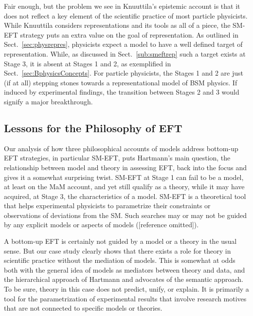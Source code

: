 Fair enough, but the problem we see in Knuuttila's epistemic account is that it does not reflect a key element of the scientific practice of most particle physicists. 
While Knuuttila considers representations and its tools as all of a piece, the SM-EFT strategy puts an extra value on the goal of representation. 
As outlined in Sect.~\ref{sec:physrepres}, physicists expect a model to have a well defined target of representation. 
While, as discussed in Sect.~\ref{sub:smeftrep} such a target exists at Stage 3, it is absent at Stages 1 and 2, as exemplified in Sect.~\ref{sec:BphysicsConcepts}. 
For particle physicists, the Stages 1 and 2 are just (if at all) stepping stones towards a representational model of BSM physics.
If induced by experimental findings, the transition between Stages 2 and 3 would signify a major breakthrough.

\subsection{Lessons for the Philosophy of EFT} \label{sub:EFT}

Our analysis of how three philosophical accounts of models address bottom-up EFT strategies, in particular SM-EFT, puts Hartmann's main question, the relationship between model and theory in assessing EFT, back into the focus and gives it a somewhat surprising twist.
SM-EFT at Stage 1 can fail to be a model, at least on the MaM account, and yet still qualify as a theory, while it may have acquired, at Stage 3, the characteristics of a model.
SM-EFT is a theoretical tool that helps experimental physicists to parametrize their constraints or observations of deviations from the SM. 
Such searches may or may not be guided by any explicit models or aspects of models ([reference omitted]).

A bottom-up EFT is certainly not guided by a model or a theory in the usual sense. But our case study clearly shows that there exists a role for theory in scientific practice without the mediation of models. 
This is somewhat at odds both with the general idea of models as mediators between theory and data, and the hierarchical approach of Hartmann and advocates of the semantic approach. 
To be sure, theory in this case does not predict, unify, or explain. 
It is primarily a tool for the parametrization of experimental results that involve research motives that are not connected to specific models or theories.

